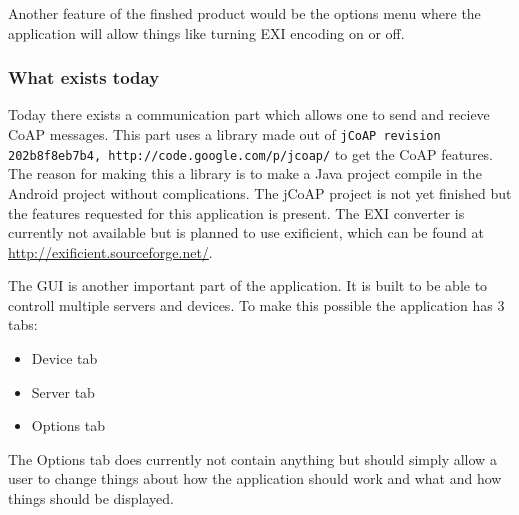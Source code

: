 Another feature of the finshed product would be the options menu where the application will allow things like turning EXI encoding on or off. 

\subsubsection{What exists today}

Today there exists a communication part which allows one to send and recieve CoAP messages. This part uses a library made out of \texttt{jCoAP revision 202b8f8eb7b4, http://code.google.com/p/jcoap/}%
to get the CoAP features. The reason for making this a library is to make a Java project compile in the Android project without complications. The jCoAP project is not yet finished but the features requested for this application is present. The EXI converter is currently not available but is planned to use exificient, 
which can be found at \url{http://exificient.sourceforge.net/}.

The GUI is another important part of the application. It is built to be able to controll multiple servers and devices. 
To make this possible the application has 3 tabs:	%
\begin{itemize}
 \item Device tab
 \item Server tab
 \item Options tab
\end{itemize}
The Options tab does currently not contain anything but should simply allow a user to change things about how the application should work and what and how things should be displayed. 

